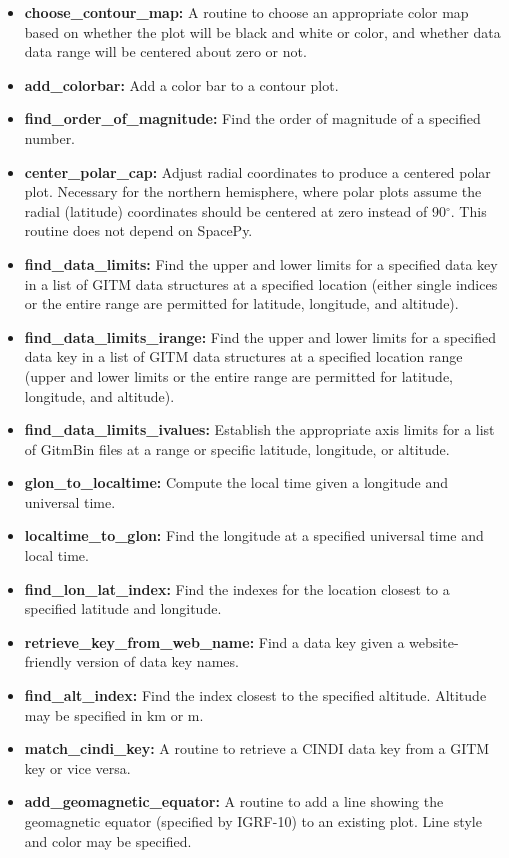 \begin{itemize}
\item[]{{\bf choose\_contour\_map: } A routine to choose an appropriate color map based on whether the plot will be black and white or color, and whether data data range will be centered about zero or not.}
\item[]{{\bf add\_colorbar:}  Add a color bar to a contour plot.}
\item[]{{\bf find\_order\_of\_magnitude: } Find the order of magnitude of a specified number.}
\item[]{{\bf center\_polar\_cap:}  Adjust radial coordinates to produce a centered polar plot.  Necessary for the northern hemisphere, where polar plots assume the radial (latitude) coordinates should be centered at zero instead of 90$^\circ$.  This routine does not depend on SpacePy.}
\item[]{{\bf find\_data\_limits:}  Find the upper and lower limits for a specified data key in a list of GITM data structures at a specified location (either single indices or the entire range are permitted for latitude, longitude, and altitude).}
\item[]{{\bf find\_data\_limits\_irange:}  Find the upper and lower limits for a specified data key in a list of GITM data structures at a specified location range (upper and lower limits or the entire range are permitted for latitude, longitude, and altitude).}
\item[]{{\bf find\_data\_limits\_ivalues: } Establish the appropriate axis limits for a list of GitmBin files at a range or specific latitude, longitude, or altitude.}
\item[]{{\bf glon\_to\_localtime: } Compute the local time given a longitude and universal time.}
\item[]{{\bf localtime\_to\_glon:}  Find the longitude at a specified universal time and local time.}
\item[]{{\bf find\_lon\_lat\_index:}  Find the indexes for the location closest to a specified latitude and longitude.}
\item[]{{\bf retrieve\_key\_from\_web\_name:}  Find a data key given a website-friendly version of data key names.}
\item[]{{\bf find\_alt\_index:} Find the index closest to the specified altitude.  Altitude may be specified in km or m.}
\item[]{{\bf match\_cindi\_key: } A routine to retrieve a CINDI data key from a GITM key or vice versa.} 
\item[]{{\bf add\_geomagnetic\_equator: } A routine to add a line showing the geomagnetic equator (specified by IGRF-10) to an existing plot.  Line style and color may be specified.}
\end{itemize}

